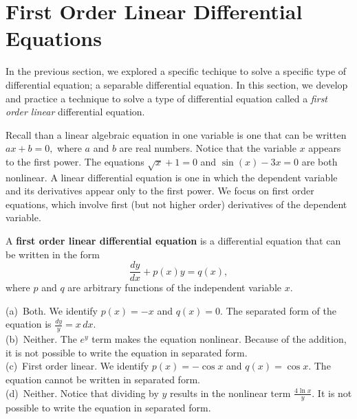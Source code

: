 
\section{First Order Linear Differential Equations}\label{sec:Linear}

In the previous section, we explored a specific techique to solve a specific type of differential equation; a separable differential equation.  In this section, we develop and practice a technique to solve a type of differential equation called a \emph{first order linear} differential equation.

Recall than a linear algebraic equation in one variable is one that can be written $ax + b = 0,$ where $a$ and $b$ are real numbers.  Notice that the variable $x$ appears to the first power.  The equations $\sqrt{x}+1=0$ and $\sin(x)-3x = 0$ are both nonlinear. A linear differential equation is one in which the dependent variable and its derivatives appear only to the first power.  We focus on first order equations, which involve first (but not higher order) derivatives of the dependent variable.

{A \textbf{first order linear differential equation} is a differential equation that can be written in the form
	\[
	\frac{dy}{dx} + p(x)y = q(x),
	\]
where $p$ and $q$ are arbitrary functions of the independent variable $x$.
}

{(a)\ Both.  We identify $p(x) = -x$ and $q(x) = 0.$  The separated form of the equation is $\displaystyle \frac{dy}{y} = x\,dx.$\\
(b)\ Neither.  The $e^y$ term makes the equation nonlinear.  Because of the addition, it is not possible to write the equation in separated form.\\
(c)\ First order linear.  We identify $p(x) = -\cos x$ and $q(x) = \cos x.$  The equation cannot be written in separated form.\\
(d)\ Neither.  Notice that dividing by $y$ results in the nonlinear term $\displaystyle \frac{4\ln x}{y}.$ It is not possible to write the equation in separated form.
}\\


